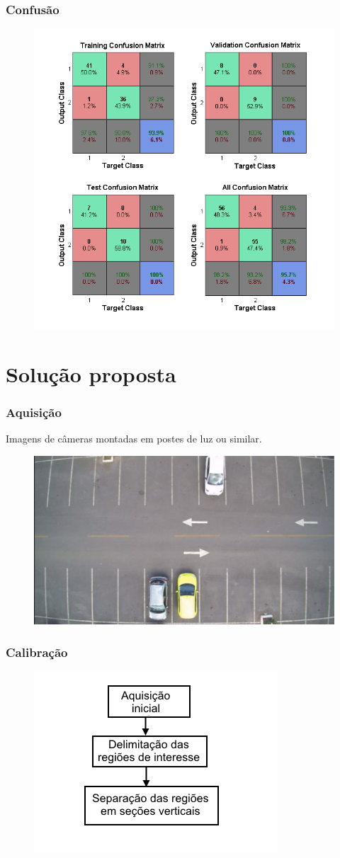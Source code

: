 \documentclass{beamer}
\begin{document}
\begin{frame}
\frametitle{Confusão}
\begin{figure}
\centering
\includegraphics[width=.6\textwidth]{ConfusaoRede}
\centering
\end{figure}

\end{frame}

\section{Solução proposta}

\begin{frame}
\frametitle{Aquisição}
    \begin{block}{}
    Imagens de câmeras montadas em postes de luz ou similar.
    \end{block}
\begin{figure}
	\centering
	\includegraphics[width=.4\textwidth]{Vazio3}
	\centering
\end{figure}
\end{frame}

\begin{frame}
\frametitle{Calibração}
\begin{figure}
	\centering
	\includegraphics[width=.8\textwidth]{fluxogramacalibracao}
	\centering
\end{figure}
\end{frame}
\end{document}
